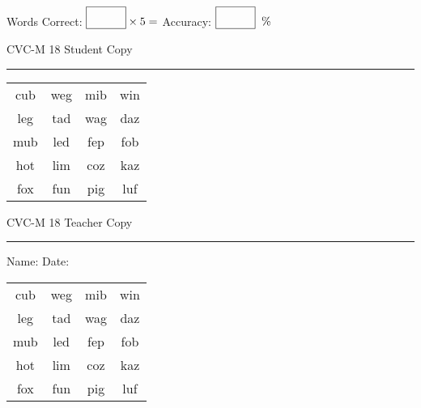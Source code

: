 \documentclass{memoir}
\begin{document}
\small

Words Correct: $\fbox{\phantom{\huge 100}} \times 5 = $ Accuracy: $\fbox{\phantom{\huge 100}}\;\; \%$ 

\vfill

\newpage


\footnotesize \noindent
CVC-M 18 \hfill Student Copy
\smallskip
\hrule

\Large

\setlength{\tabcolsep}{14pt}
\def\arraystretch{2}

{\selectfont


\begin{vplace}[0.5]
\begin{center}
\begin{tabular}{cccc}
cub & weg & mib & win \\
leg & tad & wag & daz \\
mub & led & fep & fob \\
hot & lim & coz & kaz \\
fox & fun & pig & luf \\
\end{tabular}
\end{center}
\end{vplace}

}

\newpage

\footnotesize \noindent
CVC-M 18 \hfill Teacher Copy
\smallskip
\hrule

\small

\vfill

\noindent
Name: \underline{\hspace{1.75in}} \hfill Date: \underline{\hspace{1in}}

\Large

{\selectfont


\begin{vplace}[0.5]
\begin{center}
\begin{tabular}{cccc}
cub & weg & mib & win \\
leg & tad & wag & daz \\
mub & led & fep & fob \\
hot & lim & coz & kaz \\
fox & fun & pig & luf \\
\end{tabular}
\end{center}
\end{vplace}



}
\end{document}
